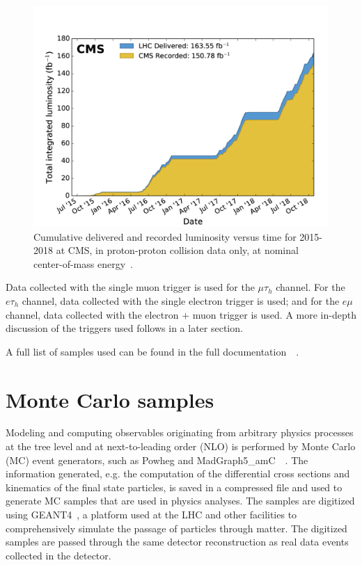 \begin{figure}[ht]
    \centering
    \includegraphics[width=13cm]{figures/ch-4-datasets-monte-carlo/int_lumi_allcumulative_pp_run2}
    \caption[Cumulative delivered and recorded luminosity versus time for 2015-2018 at CMS, in proton-proton collision data only, at nominal center-of-mass energy.]{Cumulative delivered and recorded luminosity versus time for 2015-2018 at CMS, in proton-proton collision data only, at nominal center-of-mass energy~\cite{twiki_Lumi_Public_Results}.} 
    \label{fig:integrated-luminosity-Run-2}
\end{figure}

Data collected with the single muon trigger is used for the $\mu\tau_{h}$ channel. For the $e\tau_{h}$ channel, data collected with the single electron trigger is used; and for the $e\mu$ channel, data collected with the electron $+$ muon trigger is used. A more in-depth discussion of the triggers used follows in a later section.

A full list of samples used can be found in the full documentation~\cite{CMS-AN-20-213}~\cite{CMS-HIG-22-007}.

\section{Monte Carlo samples}
\label{section:mc-samples}
Modeling and computing observables originating from arbitrary physics processes at the tree level and at next-to-leading order (NLO) is performed by Monte Carlo (MC) event generators, such as Powheg and MadGraph5\_amC\@NLO~\cite{Alwall_2014}~\cite{Frederix_2018}. The information generated, e.g. the computation of the differential cross sections and kinematics of the final state particles, is saved in a compressed file and used to generate MC samples that are used in physics analyses. The samples are digitized using GEANT4~\cite{agostinelli_geant4simulation_2003}, a platform used at the LHC and other facilities to comprehensively simulate the passage of particles through matter. The digitized samples are passed through the same detector reconstruction as real data events collected in the detector.

